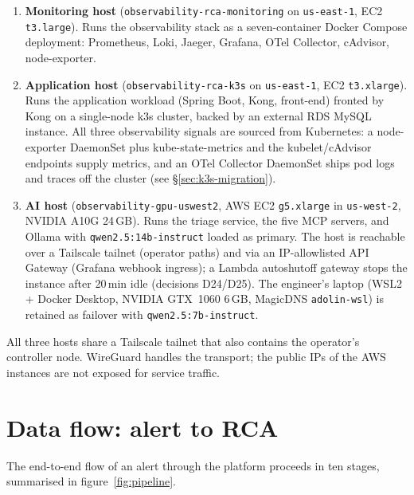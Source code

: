 \documentclass[11pt,a4paper,oneside]{report}
\begin{document}
\begin{enumerate}
  \item \textbf{Monitoring host} (\texttt{observability-rca-monitoring}
        on \texttt{us-east-1}, EC2 \texttt{t3.large}).  Runs the
        observability stack as a seven-container Docker Compose
        deployment: Prometheus, Loki, Jaeger, Grafana, OTel
        Collector, cAdvisor, node-exporter.
  \item \textbf{Application host} (\texttt{observability-rca-k3s} on
        \texttt{us-east-1}, EC2 \texttt{t3.xlarge}).  Runs the
        application workload (Spring Boot, Kong, front-end) fronted by
        Kong on a single-node k3s cluster, backed by an external RDS
        MySQL instance.  All three observability signals are sourced
        from Kubernetes: a node-exporter DaemonSet plus
        kube-state-metrics and the kubelet/cAdvisor endpoints supply
        metrics, and an OTel Collector DaemonSet ships pod logs and
        traces off the cluster (see \S\ref{sec:k3s-migration}).
  \item \textbf{AI host} (\texttt{observability-gpu-uswest2},
        AWS EC2 \texttt{g5.xlarge} in \texttt{us-west-2}, NVIDIA
        A10G 24\,GB).  Runs the triage service, the five MCP
        servers, and Ollama with \texttt{qwen2.5:14b-instruct}
        loaded as primary.  The host is reachable over a Tailscale
        tailnet (operator paths) and via an IP-allowlisted API
        Gateway (Grafana webhook ingress); a Lambda autoshutoff
        gateway stops the instance after 20\,min idle (decisions
        D24/D25).  The engineer's laptop
        (WSL2 + Docker Desktop, NVIDIA GTX~1060 6\,GB, MagicDNS
        \texttt{adolin-wsl}) is retained as failover with
        \texttt{qwen2.5:7b-instruct}.
\end{enumerate}

All three hosts share a Tailscale tailnet that also contains the
operator's controller node.  WireGuard handles the transport; the
public IPs of the AWS instances are not exposed for service traffic.

\section{Data flow: alert to RCA}

The end-to-end flow of an alert through the platform proceeds in ten
stages, summarised in figure~\ref{fig:pipeline}.
\end{document}
